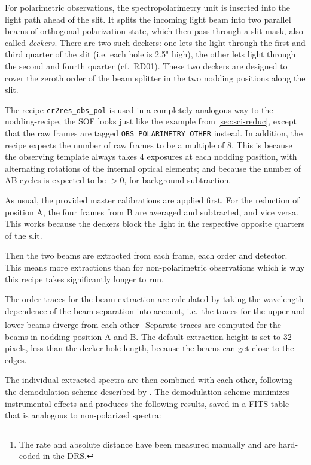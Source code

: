 For polarimetric observations, the spectropolarimetry unit is inserted into the
light path ahead of the slit. It splits the incoming light beam into two
parallel beams of orthogonal polarization state, which then pass through a slit
mask, also called \emph{deckers}. There are two such deckers: one lets the light
through the first and third quarter of the slit (i.e. each hole is 2.5" high),
the other lets light through the second and fourth quarter
(cf.~RD01\cite{CIRESMAN}). These two deckers are designed to cover the zeroth
order of the beam splitter in the two nodding positions along the slit. 

The recipe \verb!cr2res_obs_pol! is used in a completely analogous way to the
nodding-recipe, the SOF looks just like the example from
\ref{sec:sci-reduc}, except that the raw frames are tagged
\linebreak\verb!OBS_POLARIMETRY_OTHER! instead. In addition, the recipe expects
the number of raw frames to be a multiple of $8$. This is because the observing
template always takes $4$ exposures at each nodding position, with alternating
rotations of the internal optical elements; and because the number of AB-cycles
is expected to be $>0$, for background subtraction.

As usual, the provided master calibrations are applied first. 
For the reduction of position A, the four frames from B are averaged and
subtracted, and vice versa. This works because the deckers block the light in
the respective opposite quarters of the slit.

Then the two beams are extracted from each frame, each order and detector. This
means more extractions than for non-polarimetric observations which is why this
recipe takes significantly longer to run.

The order traces for the beam extraction are calculated by taking the wavelength
dependence of the beam separation into account, i.e.~the traces for the upper
and lower beams diverge from each other\footnote{The rate and absolute distance
have been measured manually and are hard-coded in the DRS.} Separate traces are
computed for the beams in nodding position A and B. The default extraction
height is set to 32 pixels, less than the decker hole length, because the beams
can get close to the edges.

The individual extracted spectra are then combined with each other, following
the demodulation scheme described by \cite{1997MNRAS.291..658D}. The
demodulation scheme minimizes instrumental effects and produces the following
results, saved in a FITS table that is analogous to non-polarized spectra:


